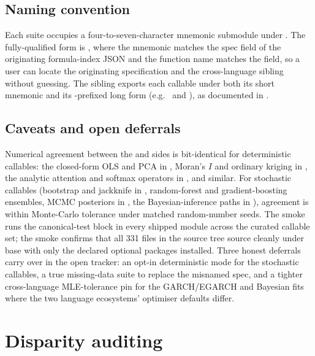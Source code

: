 \documentclass[article,shortnames,nojss]{jss}
\begin{document}
\subsection{Naming convention}\label{sec:textbook-naming}

Each suite occupies a four-to-seven-character mnemonic submodule
under .  The  fully-qualified
form is , where the
mnemonic matches the spec  field of the originating
formula-index JSON and the function name matches the
 field, so a user can locate the originating
specification and the cross-language sibling without guessing.  The  sibling exports each callable under both its
short mnemonic and its -prefixed long form (e.g.\
 and ), as
documented in \citet{Ruhela2026MorieR}.

\subsection{Caveats and open deferrals}\label{sec:textbook-caveats}

Numerical agreement between the  and
 sides is bit-identical for deterministic callables:
the closed-form OLS and PCA in \code{ml\_foundations}, Moran's
$I$ and ordinary kriging in , the analytic
attention and softmax operators in , and similar.  For stochastic callables
(bootstrap and jackknife in \code{missing\_stats}, random-forest
and gradient-boosting ensembles, MCMC posteriors in
, the Bayesian-inference paths in
), agreement is within Monte-Carlo
tolerance under matched random-number seeds.  The
 smoke runs the  canonical-test
block in every shipped module across the curated callable set;
the  smoke confirms that all 331  files
in the source tree source cleanly under base \proglang{R} with
only the declared  optional packages installed.
Three honest deferrals carry over in the open tracker: an opt-in
deterministic mode for the stochastic callables, a true
missing-data suite to replace the misnamed 
spec, and a tighter cross-language MLE-tolerance pin for the
GARCH/EGARCH and Bayesian fits where the two language
ecosystems' optimiser defaults differ.

\section{Disparity auditing}
\label{sec:fairness}
\end{document}
